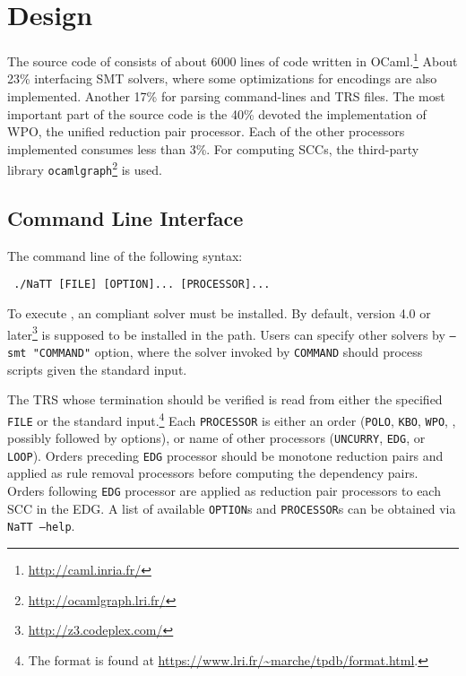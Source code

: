 \documentclass{llncs}
\begin{document}
\section{Design}
\label{sec:design}

The source code of \NaTT consists of about 6000 lines of code
written in OCaml.\footnote{\url{http://caml.inria.fr/}}
About 23\%  interfacing SMT solvers,
where some optimizations for encodings are also implemented.
Another 17\%  for parsing command-lines and TRS files.
The most important part of the source code is
the 40\% devoted 
the implementation of WPO, the unified reduction pair processor.
Each of the other processors implemented consumes less than 3\%.
For computing SCCs, the third-party library \texttt{ocamlgraph}\footnote{\url{http://ocamlgraph.lri.fr/}} is used.


\subsection{Command Line Interface}\label{sec:command}

The command line of \NaTT {} the following syntax:
\begin{center}
\tt
	./NaTT [FILE] [OPTION]... [PROCESSOR]...
\end{center}
To execute \NaTT, an  compliant solver must be installed.
By default, \Zthree version 4.0 or later\footnote{\url{http://z3.codeplex.com/}}
is supposed to be installed in the path.
Users can specify other solvers by \texttt{--smt "COMMAND"} option,
where the solver invoked by \texttt{COMMAND}
should process  scripts given  the standard input.

The TRS whose termination should be verified is read
from either the specified \texttt{FILE} or the standard input.\footnote{
The format is found at
\url{https://www.lri.fr/~marche/tpdb/format.html}.
}
Each \texttt{PROCESSOR} is either an order 
(\eg \texttt{POLO}, \texttt{KBO}, \texttt{WPO}, \etc, possibly followed by options), or
name of other processors (\texttt{UNCURRY}, \texttt{EDG}, or \texttt{LOOP}).
Orders preceding \texttt{EDG} processor should be
monotone reduction pairs and applied as rule removal processors
before computing the dependency pairs.
Orders following \texttt{EDG} processor are applied as
reduction pair processors to each SCC in the EDG.
A list of available \texttt{OPTION}s and \texttt{PROCESSOR}s
can be obtained via \texttt{NaTT --help}.
\end{document}
